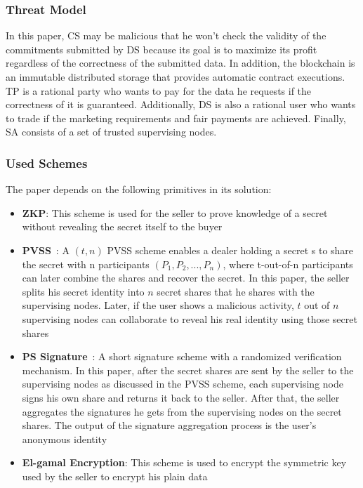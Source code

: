 \subsubsection{Threat Model}

In this paper, CS may be malicious that he won't check the validity of the commitments submitted by DS because its goal is to maximize its profit regardless of the correctness of the submitted data.
In addition, the blockchain is an immutable distributed storage that provides automatic contract executions.
TP is a rational party who wants to pay for the data he requests if the correctness of it is guaranteed.
Additionally, DS is also a rational user who wants to trade if the marketing requirements and fair payments are achieved.
Finally, SA consists of a set of trusted supervising nodes.

\subsubsection{Used Schemes}
The paper depends on the following primitives in its solution:

\begin{itemize}
    \item \textbf{ZKP}: This scheme is used for the seller to prove knowledge of a secret without revealing the secret itself to the buyer
    \item \textbf{PVSS}~\cite{schoenmakers1999simple}: A $(t,n)$ PVSS scheme enables a dealer holding a secret s to share the secret with n participants $(P_1, P_2, ..., P_n)$, where t-out-of-n participants can later combine the shares and recover the secret. In this paper, the seller splits his secret identity into $n$ secret shares that he shares with the supervising nodes. Later, if the user shows a malicious activity, $t$ out of $n$ supervising nodes can collaborate to reveal his real identity using those secret shares
    \item \textbf{PS Signature}~\cite{pointcheval2018reassessing}: A short signature scheme with a randomized verification mechanism. In this paper, after the secret shares are sent by the seller to the supervising nodes as discussed in the PVSS scheme, each supervising node signs his own share and returns it back to the seller. After that, the seller aggregates the signatures he gets from the supervising nodes on the secret shares. The output of the signature aggregation process is the user's anonymous identity
    \item \textbf{El-gamal Encryption}: This scheme is used to encrypt the symmetric key used by the seller to encrypt his plain data
\end{itemize}

